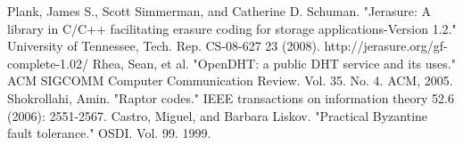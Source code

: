 \documentclass[conference]{IEEEtran}
\begin{document}
\begin{thebibliography}{00}
    Plank, James S., Scott Simmerman, and Catherine D.
        Schuman. "Jerasure: A library in C/C++ facilitating erasure coding for
        storage applications-Version 1.2." University of Tennessee, Tech. Rep.
        CS-08-627 23 (2008).
     http://jerasure.org/gf-complete-1.02/
     Rhea, Sean, et al. "OpenDHT: a public DHT service and its uses." ACM SIGCOMM Computer Communication Review. Vol. 35. No. 4. ACM, 2005.
     Shokrollahi, Amin. "Raptor codes." IEEE transactions on information theory 52.6 (2006): 2551-2567.
     Castro, Miguel, and Barbara Liskov. "Practical Byzantine fault tolerance." OSDI. Vol. 99. 1999.
\end{thebibliography}
\end{document}
